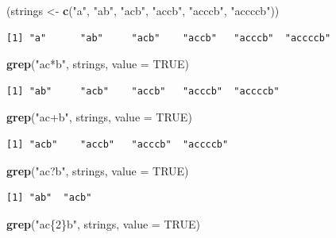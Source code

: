 \documentclass[]{book}
\newenvironment{Shaded}{\begin{snugshade}}{\end{snugshade}}
\newcommand{\DataTypeTok}[1]{\textcolor[rgb]{0.13,0.29,0.53}{#1}}
\newcommand{\KeywordTok}[1]{\textcolor[rgb]{0.13,0.29,0.53}{\textbf{#1}}}
\newcommand{\NormalTok}[1]{#1}
\newcommand{\OtherTok}[1]{\textcolor[rgb]{0.56,0.35,0.01}{#1}}
\newcommand{\StringTok}[1]{\textcolor[rgb]{0.31,0.60,0.02}{#1}}
\theoremstyle{definition}
\theoremstyle{definition}
\theoremstyle{definition}
\theoremstyle{remark}
\begin{document}
\begin{Shaded}
\begin{Highlighting}[]
\NormalTok{(strings <-}\StringTok{ }\KeywordTok{c}\NormalTok{(}\StringTok{"a"}\NormalTok{, }\StringTok{"ab"}\NormalTok{, }\StringTok{"acb"}\NormalTok{, }\StringTok{"accb"}\NormalTok{, }\StringTok{"acccb"}\NormalTok{, }\StringTok{"accccb"}\NormalTok{))}
\end{Highlighting}
\end{Shaded}

\begin{verbatim}
[1] "a"      "ab"     "acb"    "accb"   "acccb"  "accccb"
\end{verbatim}

\begin{Shaded}
\begin{Highlighting}[]
\KeywordTok{grep}\NormalTok{(}\StringTok{"ac*b"}\NormalTok{, strings, }\DataTypeTok{value =} \OtherTok{TRUE}\NormalTok{)}
\end{Highlighting}
\end{Shaded}

\begin{verbatim}
[1] "ab"     "acb"    "accb"   "acccb"  "accccb"
\end{verbatim}

\begin{Shaded}
\begin{Highlighting}[]
\KeywordTok{grep}\NormalTok{(}\StringTok{"ac+b"}\NormalTok{, strings, }\DataTypeTok{value =} \OtherTok{TRUE}\NormalTok{)}
\end{Highlighting}
\end{Shaded}

\begin{verbatim}
[1] "acb"    "accb"   "acccb"  "accccb"
\end{verbatim}

\begin{Shaded}
\begin{Highlighting}[]
\KeywordTok{grep}\NormalTok{(}\StringTok{"ac?b"}\NormalTok{, strings, }\DataTypeTok{value =} \OtherTok{TRUE}\NormalTok{)}
\end{Highlighting}
\end{Shaded}

\begin{verbatim}
[1] "ab"  "acb"
\end{verbatim}

\begin{Shaded}
\begin{Highlighting}[]
\KeywordTok{grep}\NormalTok{(}\StringTok{"ac\{2\}b"}\NormalTok{, strings, }\DataTypeTok{value =} \OtherTok{TRUE}\NormalTok{)}
\end{Highlighting}
\end{Shaded}
\end{document}
